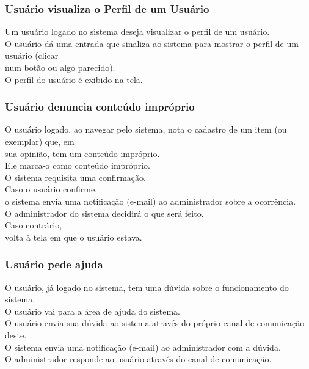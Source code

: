 \subsubsection{Usuário visualiza o Perfil de um Usuário}
\begin{tabbing}
\pgs
\>\>Um usuário logado no sistema deseja visualizar o perfil de um usuário.\\
\>\>O usuário dá uma entrada que sinaliza ao sistema para mostrar o perfil de um
usuário (clicar\\
num botão ou algo parecido).\\
\>\>O perfil do usuário é exibido na tela.
\end{tabbing}

\subsubsection{Usuário denuncia conteúdo impróprio}
\begin{tabbing}
\pgs
\>\>O usuário logado, ao navegar pelo sistema, nota o cadastro de um item
(ou exemplar) que, em\\
sua opinião, tem um conteúdo impróprio.\\
\>\>Ele marca-o como conteúdo impróprio.\\
\>\>O sistema requisita uma confirmação.\\
\>\>\>Caso o usuário confirme,\\
\>\>\>\>o sistema envia uma notificação (e-mail) ao administrador sobre a ocorrência.\\
\>\>\>\>O administrador do sistema decidirá o que será feito.\\
\>\>\>Caso contrário,\\
\>\>\>\>volta à tela em que o usuário estava.
\end{tabbing}

\subsubsection{Usuário pede ajuda}
\begin{tabbing}
\pgs
\>\>O usuário, já logado no sistema, tem uma dúvida sobre o funcionamento do sistema.\\
\>\>O usuário vai para a área de ajuda do sistema.\\
\>\>O usuário envia sua dúvida ao sistema através do próprio canal de comunicação deste.\\
\>\>O sistema envia uma notificação (e-mail) ao administrador com a dúvida.\\
\>\>O administrador responde ao usuário através do canal de comunicação.
\end{tabbing}

